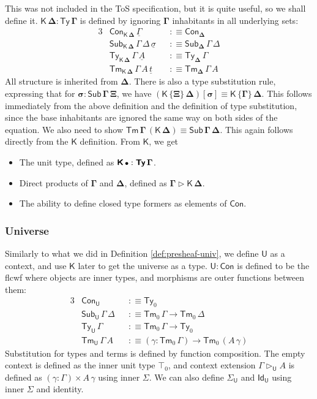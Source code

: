\documentclass[12pt,a4paper,twoside,openany]{book}
\theoremstyle{remark}
\theoremstyle{definition}
\theoremstyle{theorem}
\newcommand{\bs}[1]{\boldsymbol{#1}}
\newcommand{\Con}{\mathsf{Con}}
\newcommand{\Sub}{\mathsf{Sub}}
\newcommand{\Tm}{\mathsf{Tm}}
\newcommand{\Ty}{\mathsf{Ty}}
\newcommand{\U}{\mathsf{U}}
\newcommand{\Id}{\mathsf{Id}}
\newcommand{\ext}{\triangleright}
\newcommand{\K}{\mathsf{K}}
\newcommand{\bCon}{\bs{\Con}}
\newcommand{\bTy}{\bs{\Ty}}
\newcommand{\bGamma}{\bs{\Gamma}}
\newcommand{\bDelta}{\bs{\Delta}}
\newcommand{\bemptycon}{\scaleobj{.75}{\bs{\bullet}}}
\newcommand{\bU}{\bs{\U}}
\newcommand{\bK}{\bs{\mathsf{K}}}
\newcommand{\ul}[1]{\underline{#1}}
\newcommand{\ulGamma}{\ul{\Gamma}}
\newcommand{\ulsigma}{\ul{\sigma}}
\newcommand{\ult}{\ul{t}}
\newcommand{\ulA}{\ul{A}}
\newcommand{\defn}{:\equiv}
\begin{document}
This was not included in the ToS specification, but it is quite useful, so we
shall define it. $\bs{\K\,\Delta : \Ty\,\Gamma}$ is defined by ignoring
$\bGamma$ inhabitants in all underlying sets:
\begin{alignat*}{3}
  & \Con_{\bs{\K\,\Delta}}\,\ulGamma &&\defn \Con_{\bDelta}\\
  & \Sub_{\bs{\K\,\Delta}}\,\Gamma\,\Delta\,\ulsigma &&\defn \Sub_{\bDelta}\,\Gamma\,\Delta\\
  &  \Ty_{\bs{\K\,\Delta}}\,\Gamma\,\ulA &&\defn \Ty_{\bDelta}\,\Gamma\\
  &  \Tm_{\bs{\K\,\Delta}}\,\Gamma\,A\,\ult &&\defn \Tm_{\bDelta}\,\Gamma\,A
\end{alignat*}
All structure is inherited from $\bDelta$. There is also a type substitution
rule, expressing that for $\bs{\sigma : \Sub\,\Gamma\,\Xi}$, we have
$\bs{(\K\,\{\Xi\}\,\Delta)[\sigma]} \equiv \bs{\K\,\{\Gamma\}\,\Delta}$. This
follows immediately from the above definition and the definition of type
substitution, since the base inhabitants are ignored the same way on both sides
of the equation. We also need to show $\bs{\Tm\,\Gamma\,(\K\,\Delta)} \equiv
\bs{\Sub\,\Gamma\,\Delta}$. This again follows directly from the $\bK$
definition. From $\bK$, we get
\begin{itemize}
\item The unit type, defined as $\bK\,\bemptycon : \bTy\,\bGamma$.
\item Direct products of $\bGamma$ and $\bDelta$, defined as $\bs{\Gamma \ext \K\,\Delta}$.
\item The ability to define closed type formers as elements of $\bCon$.
\end{itemize}

\subsubsection{Universe}

Similarly to what we did in Definition \ref{def:presheaf-univ}, we define $\bU$
as a context, and use $\bK$ later to get the universe as a type. $\bU :
\bCon$ is defined to be the flcwf where objects are inner types, and morphisms
are outer functions between them:
\begin{alignat*}{3}
  &\Con_{\bU} &&\defn \Ty_0 \\
  &\Sub_{\bU}\,\Gamma\,\Delta &&\defn \Tm_0\,\Gamma \to \Tm_0\,\Delta \\
  &\Ty_{\bU}\,\Gamma    &&\defn \Tm_0\,\Gamma \to \Ty_0\\
  &\Tm_{\bU}\,\Gamma\,A &&\defn (\gamma : \Tm_0\,\Gamma) \to \Tm_0\,(A\,\gamma)
\end{alignat*}
Substitution for types and terms is defined by function composition. The empty
context is defined as the inner unit type $\top_0$, and context extension
$\Gamma \ext_{\bU} A$ is defined as $(\gamma : \Gamma) \times A\,\gamma$ using
inner $\Sigma$. We can also define $\Sigma_{\bU}$ and $\Id_{\bU}$ using inner
$\Sigma$ and identity.
\end{document}
